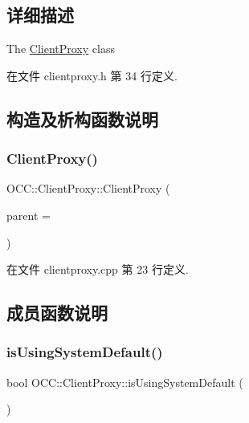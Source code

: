 \subsection{详细描述}
The \hyperlink{class_o_c_c_1_1_client_proxy}{Client\+Proxy} class 

在文件 clientproxy.\+h 第 34 行定义.



\subsection{构造及析构函数说明}
\mbox{\label{class_o_c_c_1_1_client_proxy_a826b8d6e3a56ce3d5e96130ad1de3859}} 
\subsubsection{\texorpdfstring{Client\+Proxy()}{ClientProxy()}}
{\footnotesize\ttfamily O\+C\+C\+::\+Client\+Proxy\+::\+Client\+Proxy (\begin{DoxyParamCaption}\item[{Q\+Object $\ast$}]{parent = {} }\end{DoxyParamCaption})\hspace{0.3cm}{\ttfamily [explicit]}}



在文件 clientproxy.\+cpp 第 23 行定义.



\subsection{成员函数说明}
\mbox{\label{class_o_c_c_1_1_client_proxy_a505377e2f6aa148d7950256cbde49b7c}} 
\subsubsection{\texorpdfstring{is\+Using\+System\+Default()}{isUsingSystemDefault()}}
{\footnotesize\ttfamily bool O\+C\+C\+::\+Client\+Proxy\+::is\+Using\+System\+Default (\begin{DoxyParamCaption}{ }\end{DoxyParamCaption})\hspace{0.3cm}{\ttfamily [static]}}



